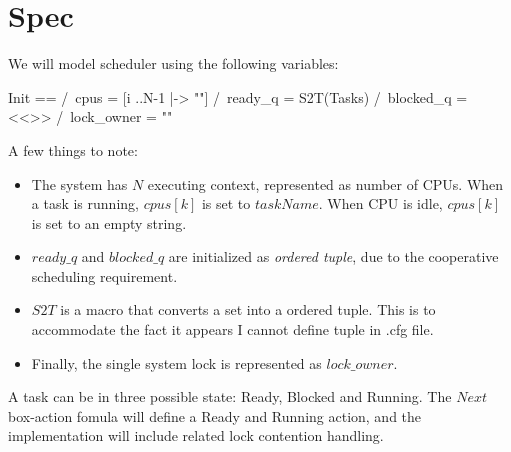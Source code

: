 \section{Spec}

We will model scheduler using the following variables:\newline
\begin{tla}
Init ==
    /\ cpus = [i ..N-1 |-> ""] 
    /\ ready_q = S2T(Tasks)
    /\ blocked_q = <<>>
    /\ lock_owner = ""
\end{tla}
\begin{tlatex}
%
%
%
%
\end{tlatex}
\newline

A few things to note:
\begin{itemize}
    \item The system has $N$ executing context, represented as number of CPUs.
    When a task is running, $cpus[k]$ is set to $taskName$. When CPU is idle,
    $cpus[k]$ is set to an empty string. 
    \item $ready\_q$ and $blocked\_q$ are initialized as \textit{ordered tuple},
    due to the cooperative scheduling requirement.
    \item $S2T$ is a macro that converts a set into a ordered tuple. This is to
    accommodate the fact it appears I cannot define tuple in .cfg file.
    \item Finally, the single system lock is represented as $lock\_owner$. 
\end{itemize}

A task can be in three possible state: Ready, Blocked and Running. The $Next$
box-action fomula will define a Ready and Running action, and the implementation
will include related lock contention handling.\newline

